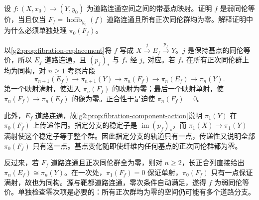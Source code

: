 \begin{exercise}\label{g2:ex:weak-equivalence-homotopy-fiber}
	设 \(f:(X,x_0)\to(Y,y_0)\) 为道路连通空间之间的带基点映射。证明 \(f\) 是弱同伦等价，当且仅当 \(F_f=\operatorname{hofib}_{y_0}(f)\) 道路连通且所有正次同伦群均为零。解释证明中为什么必须单独处理 \(\pi_0(F_f)\)。
\end{exercise}
\begin{solution}
	以\cref{g2:prop:fibration-replacement}将 \(f\) 写成 \(X\xrightarrow{j}E_f\xrightarrow{p_f}Y\)。\(j\) 是保持基点的同伦等价，所以 \(E_f\) 道路连通，且 \((p_f)_*\) 与 \(f_*\) 经 \(j_*\) 对应。若 \(f_*\) 在所有正次同伦群上均为同构，对 \(n\ge1\) 考察片段
	\[
		\pi_{n+1}(E_f)\longrightarrow\pi_{n+1}(Y)\longrightarrow\pi_n(F_f)
		\longrightarrow\pi_n(E_f)\longrightarrow\pi_n(Y).
	\]
	第一个映射满射，使进入 \(\pi_n(F_f)\) 的映射为零；最后一个映射单射，使 \(\pi_n(F_f)\to\pi_n(E_f)\) 的像为零。正合性于是迫使 \(\pi_n(F_f)=0\)。

	此外，\(E_f\) 道路连通，故\cref{g2:prop:fibration-component-action}说明 \(\pi_1(Y)\) 在 \(\pi_0(F_f)\) 上传递作用。指定分支的稳定子是 \(\operatorname{im}(p_f)_*\)，而 \(\pi_1(X)\to\pi_1(Y)\) 满射使这个稳定子等于整个群。因此指定分支的轨道只有一点，传递性又说明全部 \(\pi_0(F_f)\) 只有这一点。基点变化随即使纤维内任何基点的正次同伦群都为零。

	反过来，若 \(F_f\) 道路连通且正次同伦群全为零，则对 \(n\ge2\)，长正合列直接给出 \(\pi_n(E_f)\cong\pi_n(Y)\)。在一次处，\(\pi_1(F_f)=0\) 保证单射，\(\pi_0(F_f)\) 只有一点保证满射，故也为同构。源与靶都道路连通，零次条件自动满足，遂得 \(f\) 为弱同伦等价。单独检查零次项是必要的：所有正次群均为零的空间仍可能有多个道路分支。
\end{solution}

